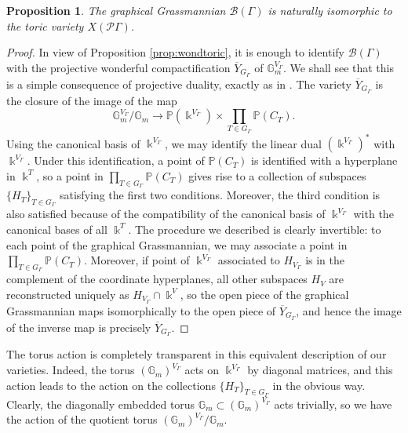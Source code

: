 \documentclass[11pt]{article}
\newtheorem{prop}[theo]{Proposition}
\theoremstyle{definition}
\numberwithin{equation}{section}
\newcommand\calB{\mathcal{B}}
\newcommand\calP{\mathcal{P}}
\newcommand\kk{\Bbbk}
\begin{document}
\begin{prop}
The graphical Grassmannian $\calB(\Gamma)$ is naturally isomorphic to the toric variety $X(\calP\Gamma)$. 
\end{prop}

\begin{proof}
In view of Proposition \ref{prop:wondtoric}, it is enough to identify $\calB(\Gamma)$ with the projective wonderful compactification $\overline{Y}_{G_\Gamma}$ of $\mathbb{G}_m^{V_\Gamma}$. We shall see that this is a simple consequence of projective duality, exactly as in \cite[Th.~5.2.1]{MR4072173}. The variety $\overline{Y}_{G_\Gamma}$ is the closure of the image of the map
 \[
\mathbb{G}_m^{V_\Gamma}/\mathbb{G}_m\to\mathbb{P}(\kk^{V_\Gamma})\times\prod_{T\in G_\Gamma} \mathbb{P}(C_T).
 \]
Using the canonical basis of $\kk^{V_\Gamma}$, we may identify the linear dual $(\kk^{V_\Gamma})^*$ with $\kk^{V_\Gamma}$. Under this identification, a point of $\mathbb{P}(C_T)$ is identified with a hyperplane in $\kk^{T}$, so a point in $\prod_{T\in G_\Gamma} \mathbb{P}(C_T)$ gives rise to a collection of subspaces $\{H_T\}_{T\in G_\Gamma}$ satisfying the first two conditions. Moreover, the third condition is also satisfied because of the compatibility of the canonical basis of $\kk^{V_\Gamma}$ with the canonical bases of all $\kk^T$. The procedure we described is clearly invertible: to each point of the graphical Grassmannian, we may associate a point in $\prod_{T\in G_\Gamma} \mathbb{P}(C_T)$. Moreover, if point of $\kk^{V_\Gamma}$ associated to $H_{V_\Gamma}$ is in the complement of the coordinate hyperplanes, all other subspaces $H_V$ are reconstructed uniquely as $H_{V_\Gamma}\cap\kk^{V}$, so the open piece of the graphical Grassmannian maps isomorphically to the open piece of $\overline{Y}_{G_\Gamma}$, and hence the image of the inverse map is precisely $\overline{Y}_{G_\Gamma}$.
\end{proof}

The torus action is completely transparent in this equivalent description of our varieties. Indeed, the torus $(\mathbb{G}_m)^{V_\Gamma}$ acts on $\kk^{V_\Gamma}$ by diagonal matrices, and this action leads to the action on the collections $\{H_T\}_{T\in G_\Gamma}$ in the obvious way. Clearly, the diagonally embedded torus $\mathbb{G}_m\subset (\mathbb{G}_m)^{V_\Gamma}$ acts trivially, so we have the action of the quotient torus $(\mathbb{G}_m)^{V_\Gamma}/\mathbb{G}_m$. 
\end{document}

